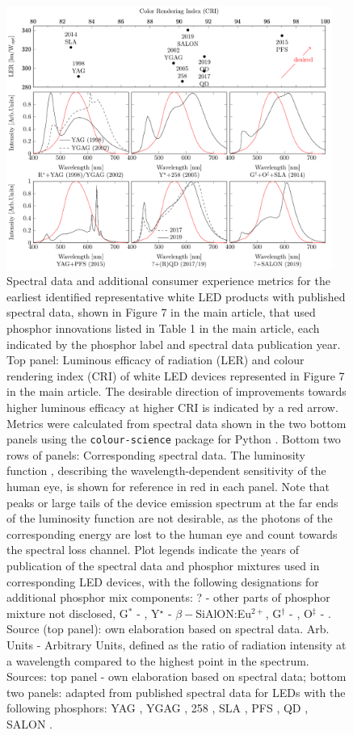 \documentclass[10pt]{article}
\begin{document}
\begin{figure}[H]
	\centering
    \includegraphics[width=0.95\textwidth]{2_SSL_EES/article/figures/phosphor_spectrum-comparison.pdf}
	\caption{Spectral data and additional consumer experience metrics for the earliest identified representative white LED products with published spectral data, shown in Figure 7 in the main article, that used phosphor innovations listed in Table 1 in the main article, each indicated by the phosphor label and spectral data publication year. Top panel: Luminous efficacy of radiation (LER) and colour rendering index (CRI) of white LED devices represented in Figure 7 in the main article. The desirable direction of improvements towards higher luminous efficacy at higher CRI is indicated by a red arrow. Metrics were calculated from spectral data shown in the two bottom panels using the \texttt{colour-science} package for Python \cite{colour-science_software}. Bottom two rows of panels: Corresponding spectral data. The luminosity function \cite{cie-term-lumeff}, describing the wavelength-dependent sensitivity of the human eye, is shown for reference in red in each panel. Note that peaks or large tails of the device emission spectrum at the far ends of the luminosity function are not desirable, as the photons of the corresponding energy are lost to the human eye and count towards the spectral loss channel. Plot legends indicate the years of publication of the spectral data and phosphor mixtures used in corresponding LED devices, with the following designations for additional phosphor mix components: ? -  other parts of phosphor mixture not disclosed, G$^*$ - , Y$^\star$ - $\beta-$SiAlON:Eu$^{2+}$, G$^\dagger$ - , O$^\ddagger$ - . Source (top panel): own elaboration based on spectral data. Arb. Units - Arbitrary Units, defined as the ratio of radiation intensity at a wavelength compared to the highest point in the spectrum. Sources: top panel - own elaboration based on spectral data; bottom two panels: adapted from published spectral data for LEDs with the following phosphors: YAG \cite{bando1998development}, YGAG \cite{Mueller2002}, 258 \cite{MuellerMach2005}, SLA \cite{Pust2014}, PFS \cite{trigain_spectrum}, QD \cite{lumileds2016qd}\cite{osram2019qd}, SALON \cite{Hoerder2019}.}

\end{figure}
\end{document}
